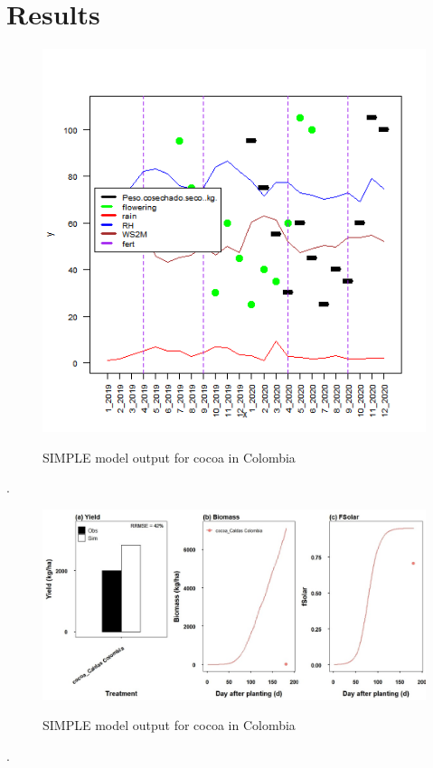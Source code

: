 \documentclass[gene,journal,article,submit,moreauthors,pdftex]{Definitions/mdpi}
\begin{document}
\section{Results}
\begin{figure}[h]
	\centering
	\caption{\footnotesize {SIMPLE model output for cocoa in Colombia }} 
	\includegraphics[scale=0.4]{images/averageS.png}\\
	\label{fig:weather}
\end{figure}.

\begin{figure}[h]
	\centering
	\caption{\footnotesize {SIMPLE model output for cocoa in Colombia }} 
	\includegraphics[scale=0.4]{images/outmodel.jpg}\\
	\label{fig:m1}
\end{figure}.
\end{document}
